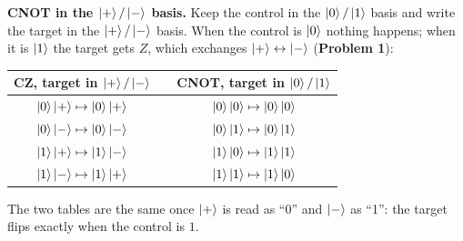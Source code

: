\documentclass[a4paper, 10pt]{article}
\begin{document}
\begin{solution}
	\noindent \textbf{CNOT in the \( \ket{+}/\ket{-} \) basis.} Keep the control in the \( \ket{0}/\ket{1} \) basis and write the target in the \( \ket{+}/\ket{-} \) basis.
	When the control is \( \ket{0} \) nothing happens; when it is \( \ket{1} \) the target gets \( Z \), which exchanges \( \ket{+} \leftrightarrow \ket{-} \) (\textbf{Problem 1}):
	\begin{center}
		\begin{tabular}{ccc}
			\toprule
			CZ, target in \( \ket{+}/\ket{-} \)         & \qquad & CNOT, target in \( \ket{0}/\ket{1} \)       \\
			\midrule
			\( \ket{0}\ket{+} \mapsto \ket{0}\ket{+} \) &        & \( \ket{0}\ket{0} \mapsto \ket{0}\ket{0} \) \\
			\( \ket{0}\ket{-} \mapsto \ket{0}\ket{-} \) &        & \( \ket{0}\ket{1} \mapsto \ket{0}\ket{1} \) \\
			\( \ket{1}\ket{+} \mapsto \ket{1}\ket{-} \) &        & \( \ket{1}\ket{0} \mapsto \ket{1}\ket{1} \) \\
			\( \ket{1}\ket{-} \mapsto \ket{1}\ket{+} \) &        & \( \ket{1}\ket{1} \mapsto \ket{1}\ket{0} \) \\
			\bottomrule
		\end{tabular}
	\end{center}
	The two tables are the same once \( \ket{+} \) is read as ``0'' and \( \ket{-} \) as ``1'': the target flips exactly when the control is \( 1 \).


\end{solution}
\end{document}
